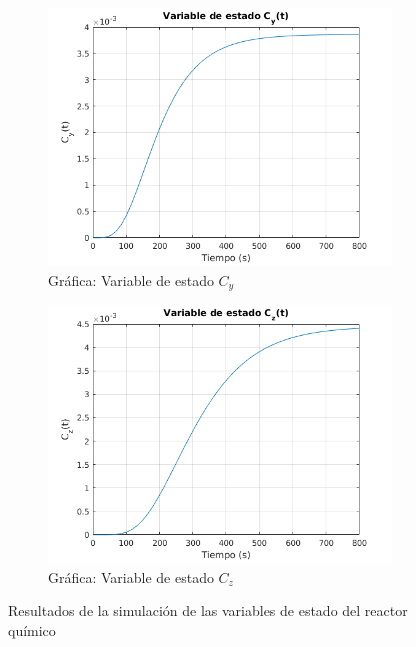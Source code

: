 \documentclass[12pt,letterpaper]{article}
\begin{document}
\begin{figure}
\begin{subfigure}[b]{0.45\textwidth}
	\includegraphics[width=\textwidth]{pictures/Ejercicio4/var_estado_Cy}
	\caption{Gráfica: Variable de estado $C_y$}
	\label{fig:var_estado_Cy}
  \end{subfigure}
  \begin{subfigure}[b]{0.45\textwidth}
	\includegraphics[width=\textwidth]{pictures/Ejercicio4/var_estado_Cz}
	\caption{Gráfica: Variable de estado $C_z$}
	\label{fig:var_estado_Cz}
  \end{subfigure}

  \caption{Resultados de la simulación de las variables de estado del reactor químico}
  \label{fig:result_mve_reactor}
\end{figure}
\end{document}

